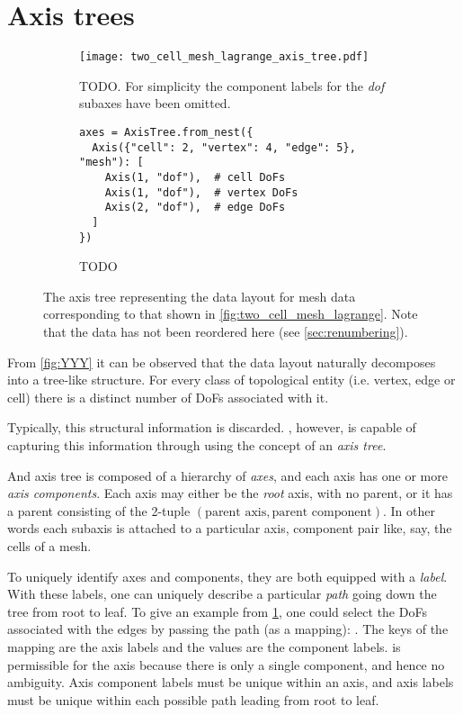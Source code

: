 \documentclass[thesis]{subfiles}
\begin{document}
\section{Axis trees}

\begin{figure}
  \centering
  \begin{subfigure}{.6\textwidth}
    \centering
    \texttt{[image: two\_cell\_mesh\_lagrange\_axis\_tree.pdf]}
    \caption{
      TODO.
      For simplicity the component labels for the \textit{dof} subaxes have been omitted.
    }
    \label{fig:two_cell_mesh_lagrange_axis_tree}
  \end{subfigure}
  \vspace{1em}
  \begin{subfigure}{\textwidth}
    \centering
    \begin{verbatim}
axes = AxisTree.from_nest({
  Axis({"cell": 2, "vertex": 4, "edge": 5}, "mesh"): [
    Axis(1, "dof"),  # cell DoFs
    Axis(1, "dof"),  # vertex DoFs
    Axis(2, "dof"),  # edge DoFs
  ]
})
    \end{verbatim}
    \caption{TODO}
    \label{fig:two_cell_mesh_lagrange_code}
  \end{subfigure}
  \caption{
    The axis tree representing the data layout for mesh data corresponding to that shown in \cref{fig:two_cell_mesh_lagrange}.
    Note that the data has not been reordered here (see \cref{sec:renumbering}).
  }
  \label{fig:two_cell_mesh_lagrange_pyop3}
\end{figure}

From \cref{fig:YYY} it can be observed that the data layout naturally decomposes into a tree-like structure.
For every class of topological entity (i.e. vertex, edge or cell) there is a distinct number of DoFs associated with it.

Typically, this structural information is discarded.
, however, is capable of capturing this information through using the concept of an \textit{axis tree}.

And axis tree is composed of a hierarchy of \textit{axes}, and each axis has one or more \textit{axis components}.
Each axis may either be the \textit{root} axis, with no parent, or it has a parent consisting of the 2-tuple $(\textrm{parent axis}, \textrm{parent component})$.
In other words each subaxis is attached to a particular axis, component pair like, say, the cells of a mesh.

To uniquely identify axes and components, they are both equipped with a \textit{label}.
With these labels, one can uniquely describe a particular \textit{path} going down the tree from root to leaf.
To give an example from \cref{fig:two_cell_mesh_lagrange_axis_tree}, one could select the DoFs associated with the edges by passing the path (as a mapping): .
The keys of the mapping are the axis labels and the values are the component labels.
 is permissible for the  axis because there is only a single component, and hence no ambiguity.
Axis component labels must be unique within an axis, and axis labels must be unique within each possible path leading from root to leaf.
\end{document}
